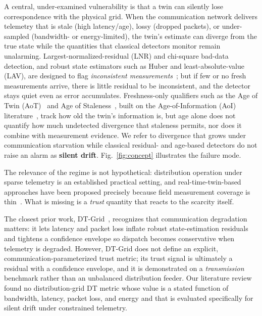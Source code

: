 \documentclass[journal]{IEEEtran}
\theoremstyle{plain}
\theoremstyle{definition}
\theoremstyle{remark}
\begin{document}
A central, under-examined vulnerability is that a twin can silently lose
correspondence with the physical grid. When the communication network
delivers telemetry that is stale (high latency/age), lossy (dropped
packets), or under-sampled (bandwidth- or energy-limited), the twin's
estimate can diverge from the true state while the quantities that
classical detectors monitor remain unalarming. Largest-normalized-residual
(LNR) and chi-square bad-data detection, and robust state estimators such
as Huber and least-absolute-value (LAV), are designed to flag
\emph{inconsistent measurements}~\cite{abur2004, handschin1975,
gol2014lav}; but if few or no fresh measurements arrive, there is little
residual to be inconsistent, and the detector stays quiet even as error
accumulates. Freshness-only qualifiers such as the Age of Twin
(AoT)~\cite{duran2023} and Age of Staleness~\cite{cosandal2026}, built on
the Age-of-Information (AoI) literature~\cite{yates2021}, track how old
the twin's information is, but age alone does not quantify how much
undetected divergence that staleness permits, nor does it combine with
measurement evidence. We refer to divergence that grows under
communication starvation while classical residual- and age-based detectors
do not raise an alarm as \textbf{silent drift}. Fig.~\ref{fig:concept}
illustrates the failure mode.

The relevance of the regime is not hypothetical: distribution operation
under sparse telemetry is an established practical setting, and
real-time-twin-based approaches have been proposed precisely because field
measurement coverage is thin~\cite{darbali2021}. What is missing is a
\emph{trust} quantity that reacts to the scarcity itself.

The closest prior work, DT-Grid~\cite{dtgrid2026}, recognizes that
communication degradation matters: it lets latency and packet loss inflate
robust state-estimation residuals and tightens a confidence envelope so
dispatch becomes conservative when telemetry is degraded. However,
DT-Grid does not define an explicit, communication-parameterized trust
metric; its trust signal is ultimately a residual with a confidence
envelope, and it is demonstrated on a \emph{transmission} benchmark
rather than an unbalanced distribution feeder. Our literature review found
no distribution-grid DT metric whose value is a stated function of
bandwidth, latency, packet loss, and energy and that is evaluated
specifically for silent drift under constrained telemetry.
\end{document}
